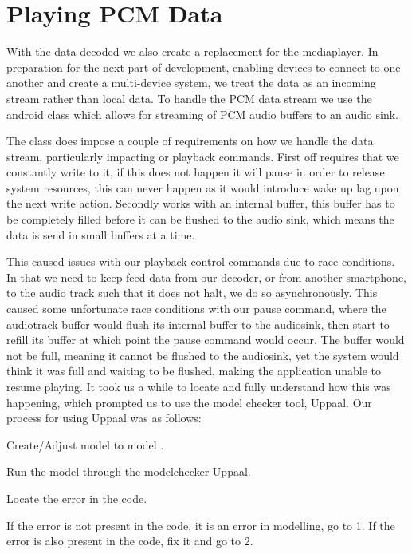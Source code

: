 \section{Playing \acs{PCM} Data}
With the data decoded we also create a replacement for the mediaplayer.
In preparation for the next part of development, enabling devices to connect to one another and create a multi-device system, we treat the data as an incoming stream rather than local data.
To handle the \ac{PCM} data stream we use the android class  which allows for streaming of PCM audio buffers to an audio sink.

The  class does impose a couple of requirements on how we handle the data stream, particularly impacting or playback commands.
First off  requires that we constantly write to it, if this does not happen it will pause in order to release system resources, this can never happen as it would introduce wake up lag upon the next write action.
Secondly  works with an internal buffer, this buffer has to be completely filled before it can be flushed to the audio sink, which means the data is send in small buffers at a time.\cite{audiotrack}

This caused issues with our playback control commands due to race conditions.
In that we need to keep feed data from our decoder, or from another smartphone, to the audio track such that it does not halt, we do so asynchronously.
This caused some unfortunate race conditions with our pause command, where the audiotrack buffer would flush its internal buffer to the audiosink, then start to refill its buffer at which point the pause command would occur.
The buffer would not be full, meaning it cannot be flushed to the audiosink, yet the system would think it was full and waiting to be flushed, making the application unable to resume playing.
It took us a while to locate and fully understand how this was happening, which prompted us to use the model checker tool, Uppaal.
Our process for using Uppaal was as follows:
\begin{enumberate}
    \item Create/Adjust model to model .
    \item Run the model through the modelchecker Uppaal.
    \item Locate the error in the code.
    \item If the error is not present in the code, it is an error in modelling, go to 1. If the error is also present in the code, fix it and go to 2.
\end{enumberate}


